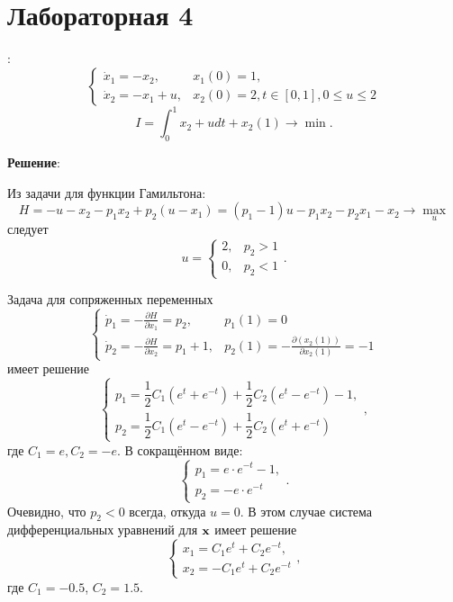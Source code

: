 \documentclass[a4paper, 12pt]{article}
\newcommand{\df}[2]{\frac{\partial #1}{\partial #2}}
\begin{document}
\section{Лабораторная 4}

{}:
\begin{equation}
    \begin{cases}
        \dot x_1 =-x_2, & x_1(0)=1,\\
        \dot x_2=-x_1+u,& x_2(0)=2, t \in [0,1], 0\leq u \leq 2
    \end{cases}
\end{equation}
\begin{equation}
    I=\int_0^{1} x_2 + u dt +x_2(1) \rightarrow \min.
\end{equation}

{\bf Решение}:

Из задачи для функции Гамильтона:
\begin{equation}
    H=-u-x_2-p_1 x_2 + p_2 (u-x_1)=(p_1-1) u - p_1 x_2 -p_2 x_1 -x_2 \rightarrow \max_u
\end{equation}
следует
\begin{equation}
    u=
    \begin{cases}
        2,&p_2>1\\
        0,&p_2<1
    \end{cases}.
\end{equation}

Задача для сопряженных переменных
\begin{equation}
    \begin{cases}
        \dot p_1 = -\df{H}{x_1}=p_2, &p_1(1)=0\\
        \dot p_2=- \df{H}{x_2}=p_1+1, &p_2(1)=-\df{(x_2(1))}{x_2(1)}=-1
    \end{cases}
\end{equation}
имеет решение
\begin{equation}
    \begin{cases}
        p_1=\dfrac{1}{2}C_1 (e^t+e^{-t})+\dfrac{1}{2} C_2 (e^t-e^{-t})-1,\\
        p_2=\dfrac{1}{2}C_1 (e^t-e^{-t})+\dfrac{1}{2} C_2 (e^t+e^{-t})
    \end{cases},
\end{equation}
где $C_1=e,C_2=-e$. В сокращённом виде:
\begin{equation}
    \begin{cases}
        p_1=e \cdot e^{-t}-1,\\
        p_2=-e \cdot e^{-t}
    \end{cases}.
\end{equation}
Очевидно, что $p_2<0$ всегда, откуда $u=0$. В этом случае система дифференциальных уравнений для ${\bf x}$ имеет решение
\begin{equation}
    \begin{cases}
        x_1=C_1 e^t + C_2 e^{-t},\\
        x_2=-C_1 e^t + C_2 e^{-t}
    \end{cases},
\end{equation}
где $C_1=-0.5$, $C_2=1.5$.
\end{document}
